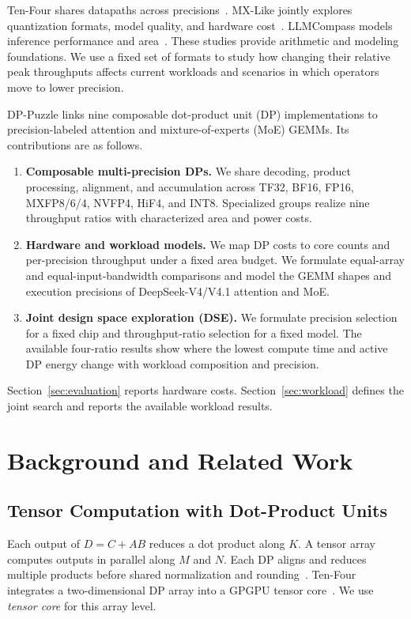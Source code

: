 \documentclass[conference,9pt,letterpaper]{IEEEtran}
\begin{document}
Ten-Four shares datapaths across precisions~\cite{rout2026tenfourv3}. MX-Like jointly explores quantization formats, model quality, and hardware cost~\cite{zhao2026mxlike}. LLMCompass models inference performance and area~\cite{zhang2024llmcompass}. These studies provide arithmetic and modeling foundations. We use a fixed set of formats to study how changing their relative peak throughputs affects current workloads and scenarios in which operators move to lower precision.

DP-Puzzle links nine composable dot-product unit (DP) implementations to precision-labeled attention and mixture-of-experts (MoE) GEMMs. Its contributions are as follows.
\begin{enumerate}
\item \textbf{Composable multi-precision DPs.} We share decoding, product processing, alignment, and accumulation across TF32, BF16, FP16, MXFP8/6/4, NVFP4, HiF4, and INT8. Specialized groups realize nine throughput ratios with characterized area and power costs.
\item \textbf{Hardware and workload models.} We map DP costs to core counts and per-precision throughput under a fixed area budget. We formulate equal-array and equal-input-bandwidth comparisons and model the GEMM shapes and execution precisions of DeepSeek-V4/V4.1 attention and MoE.
\item \textbf{Joint design space exploration (DSE).} We formulate precision selection for a fixed chip and throughput-ratio selection for a fixed model. The available four-ratio results show where the lowest compute time and active DP energy change with workload composition and precision.
\end{enumerate}
Section~\ref{sec:evaluation} reports hardware costs. Section~\ref{sec:workload} defines the joint search and reports the available workload results.

\section{Background and Related Work}
\label{sec:background}

\subsection{Tensor Computation with Dot-Product Units}
\label{sec:tensor_organization}

Each output of $D=C+AB$ reduces a dot product along $K$. A tensor array computes outputs in parallel along $M$ and $N$. Each DP aligns and reduces multiple products before shared normalization and rounding~\cite{lutzFusedFP84Way2024}. Ten-Four integrates a two-dimensional DP array into a GPGPU tensor core~\cite{rout2026tenfourv3}. We use \emph{tensor core} for this array level.
\end{document}
